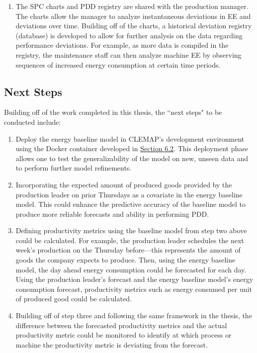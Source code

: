 \begin{enumerate}
    \item The SPC charts and PDD registry are shared with the production manager. The charts allow the manager to analyze instantaneous deviations in EE and deviations over time. Building off of the charts, a historical deviation registry (database) is developed to allow for further analysis on the data regarding performance deviations. For example, as more data is compiled in the registry, the maintenance staff can then analyze machine EE by observing sequences of increased energy consumption at certain time periods.
    
\end{enumerate}

\subsection{Next Steps}

Building off of the work completed in this thesis, the ``next steps" to be conducted include:

\begin{enumerate}

    \item Deploy the energy baseline model in CLEMAP's development environment using the Docker container developed in \hyperlink{subsection.6.2}{Section 6.2}. This deployment phase allows one to test the generalizability of the model on new, unseen data and to perform further model refinements. 

    \item Incorporating the expected amount of produced goods provided by the production leader on prior Thursdays as a covariate in the energy baseline model. This could enhance the predictive accuracy of the baseline model to produce more reliable forecasts and ability in performing PDD.
    
    \item Defining productivity metrics using the baseline model from step two above could be calculated. For example, the production leader schedules the next week's production on the Thursday before—this represents the amount of goods the company expects to produce. Then, using the energy baseline model, the day ahead energy consumption could be forecasted for each day. Using the production leader's forecast and the energy baseline model's energy consumption forecast, productivity metrics such as energy consumed per unit of produced good could be calculated.
    
    \item Building off of step three and following the same framework in the thesis, the difference between the forecasted productivity metrics and the actual productivity metric could be monitored to identify at which process or machine the productivity metric is deviating from the forecast.
\end{enumerate}